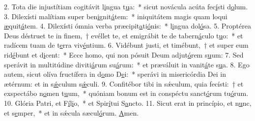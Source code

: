 2. Tota die injustítiam cogitávit l\uline{i}ngua t\uline{u}a:~* sicut novácula acúta fec\uline{í}sti d\uline{o}lum.
3. Dilexísti malítiam super ben\uline{i}gnit\uline{á}tem:~* iniquitátem magis quam loqui \uline{æ}quit\uline{á}tem.
4. Dilexísti ómnia verba præcipit\uline{a}ti\uline{ó}nis:~* l\uline{i}ngua dol\uline{ó}sa.
5. Proptérea Deus déstruet te in finem,~† evéllet te, et emigrábit te de tabern\uline{á}culo t\uline{u}o:~* et radícem tuam de t\uline{e}rra viv\uline{é}ntium.
6. Vidébunt justi, et timébunt,~† et super eum rid\uline{é}bunt et d\uline{i}cent:~* Ecce homo, qui non pósuit Deum adjut\uline{ó}rem s\uline{u}um:
7. Sed sperávit in multitúdine diviti\uline{á}rum su\uline{á}rum:~* et præváluit in vanit\uline{á}te s\uline{u}a.
8. Ego autem, sicut olíva fructífera in d\uline{o}mo D\uline{e}i:~* sperávi in misericórdia Dei in ætérnum: et in s\uline{ǽ}culum s\uline{ǽ}culi.
9. Confitébor tibi in sǽculum, quia fecísti:~† et exspectábo n\uline{o}men t\uline{u}um,~* quóniam bonum est in conspéctu sanct\uline{ó}rum tu\uline{ó}rum.
10. Glória Patri, et F\uline{í}l\uline{i}o,~* et Spir\uline{í}tui S\uline{a}ncto.
11. Sicut erat in princípio, et n\uline{u}nc, et s\uline{e}mper,~* et in sǽcula sæcul\uline{ó}rum. \uline{A}men.
